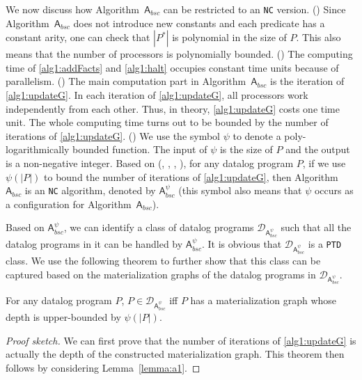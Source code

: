 \documentclass[final,1p,times]{elsarticle}
\begin{document}
We now discuss how Algorithm~$\mathsf{A}_{bsc}$ can be restricted to an \texttt{NC} version.
(\uppercase\expandafter{}) Since Algorithm~$\mathsf{A}_{bsc}$ does not introduce
new constants and each predicate has a constant arity,
one can check that $|P^*|$ is polynomial in the size of $P$. This also means that
the number of processors is polynomially bounded.
(\uppercase\expandafter{}) The computing time of \ref{alg1:addFacts}
and \ref{alg1:halt} occupies constant time units because of parallelism.
(\uppercase\expandafter{}) The main computation part in Algorithm~$\mathsf{A}_{bsc}$ is the
iteration of \ref{alg1:updateG}.
In each iteration of \ref{alg1:updateG}, all processors work independently from each other.
Thus, in theory, \ref{alg1:updateG} costs one time unit.
The whole computing time turns out to be bounded by the number of iterations of \ref{alg1:updateG}. (\uppercase\expandafter{})
We use the symbol $\psi$ to denote a poly-logarithmically bounded function.
The input of $\psi$ is the size of $P$ and the output is a non-negative integer.
Based on (\uppercase\expandafter{}, \uppercase\expandafter{},
\uppercase\expandafter{}, \uppercase\expandafter{}),
for any datalog program $P$, if we use $\psi(|P|)$ to
bound the number of iterations of \ref{alg1:updateG}, then Algorithm~$\mathsf{A}_{bsc}$
is an \texttt{NC} algorithm, denoted by $\mathsf{A}_{bsc}^{\psi}$ (this symbol also
means that $\psi$ occurs as a configuration for Algorithm~$\mathsf{A}_{bsc}$).

Based on $\mathsf{A}_{bsc}^{\psi}$, we can identify a class of datalog programs
$\mathcal{D}_{\mathsf{A}_{bsc}^{\psi}}$ such that all the datalog programs in it can be handled
by $\mathsf{A}_{bsc}^{\psi}$.
It is obvious that $\mathcal{D}_{\mathsf{A}_{bsc}^{\psi}}$ is a \texttt{PTD} class.
We use the following theorem to further show that this class can be captured based on
the materialization graphs of the datalog programs in $\mathcal{D}_{\mathsf{A}_{bsc}^{\psi}}$.

\begin{theorem}\label{theorem:a1}
For any datalog program $P$, $P\in\mathcal{D}_{\mathsf{A}_{bsc}^{\psi}}$ iff $P$ has a
materialization graph whose depth is upper-bounded by $\psi(|P|)$.
\end{theorem}

\begin{proof}[Proof sketch]
We can first prove that the number of iterations
of \ref{alg1:updateG} is actually the depth of the constructed materialization
graph. This theorem then follows by considering
Lemma~\ref{lemma:a1}.
\end{proof}
\end{document}
